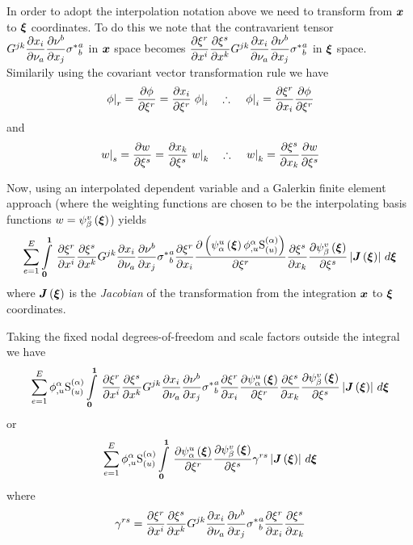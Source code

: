 In order to adopt the interpolation notation above we need to transform from
$\vect{x}$ to $\vect{\xi}$ coordinates. To do this we note that the
contravarient tensor
$G^{jk} \dfrac{\partial x_{i}}{\partial \nu_{a}}  \dfrac{\partial \nu^{b}}{\partial x_{j}} {\sigma^{*}}^{a}_{b}$ in
$\vect{x}$ space becomes
$ \dfrac{\partial \xi^{r}}{\partial x^{i}}  \dfrac{\partial \xi^{s}}{\partial x^{k}} G^{jk} \dfrac{\partial x_{i}}{\partial \nu_{a}}  \dfrac{\partial \nu^{b}}{\partial x_{j}} {\sigma^{*}}^{a}_{b}$
in $\vect{\xi}$ space. Similarily using the covariant vector transformation
rule we have
\begin{equation}
   \left. \phi \right|_{r} = \dfrac{\partial \phi}{\partial \xi^{r}} = \dfrac{\partial x_{i}}{\partial \xi^{r}}  \left. \phi \right|_{i} \quad\therefore\quad \left. \phi \right|_{i} = \dfrac{\partial \xi^{r}}{\partial x_{i}}  \dfrac{\partial \phi}{\partial \xi^{r}} 
\end{equation}
and
\begin{equation}
   \left. w \right|_{s} = \dfrac{\partial w}{\partial \xi^{s}} = \dfrac{\partial x_{k}}{\partial \xi^{s}}  \left. w \right|_{k} \quad\therefore\quad \left. w \right|_{k} = \dfrac{\partial \xi^{s}}{\partial x_{k}}  \dfrac{\partial w}{\partial \xi^{s}} 
\end{equation}

Now, using an interpolated dependent variable and a Galerkin finite element
approach (where the weighting functions are chosen to be the interpolating
basis functions \ie $w=\gbfn{\beta}{v}{\vect{\xi}}$) yields
\begin{equation}
  \dsum_{e=1}^{E}\gint{\vect{0}}{\vect{1}}{\delby{\xi^{r}}{x^{i}}\delby{\xi^{s}}{x^{k}}G^{jk}\delby{x_{i}}{\nu_{a}}\delby{\nu^{b}}{x_{j}}{\sigma^{*}}^{a}_{b}
    \delby{\xi^{r}}{x_{i}}\delby{\pbrac{\gbfn{\alpha}{u}{\vect{\xi}}\nodedof{\phi}{\alpha}{u}\gsf{(\alpha)}{(u)}}}{\xi^{r}}
    \delby{\xi^{s}}{x_{k}}\delby{\gbfn{\beta}{v}{\vect{\xi}}}{\xi^{s}}
    \abs{\fnof{\matr{J}}{\vect{\xi}}}}{\vect{\xi}}
\end{equation}
where $\fnof{\matr{J}}{\vect{\xi}}$ is the \emph{Jacobian} of the
transformation from the integration $\vect{x}$ to $\vect{\xi}$ coordinates.


Taking the fixed nodal degrees-of-freedom and scale factors outside the integral we have
\begin{equation}
  \dsum_{e=1}^{E}\nodedof{\phi}{\alpha}{u}\gsf{(\alpha)}{(u)}
  \gint{\vect{0}}{\vect{1}}{\delby{\xi^{r}}{x^{i}}\delby{\xi^{s}}{x^{k}}G^{jk}\delby{x_{i}}{\nu_{a}}\delby{\nu^{b}}{x_{j}}{\sigma^{*}}^{a}_{b}
    \delby{\xi^{r}}{x_{i}}\delby{\gbfn{\alpha}{u}{\vect{\xi}}}{\xi^{r}}
    \delby{\xi^{s}}{x_{k}}\delby{\gbfn{\beta}{v}{\vect{\xi}}}{\xi^{s}}
    \abs{\fnof{\matr{J}}{\vect{\xi}}}}{\vect{\xi}}
  \label{eqn:elementalfemlhs1}
\end{equation}
or
\begin{equation}
  \dsum_{e=1}^{E}\nodedof{\phi}{\alpha}{u}\gsf{(\alpha)}{(u)}
  \gint{\vect{0}}{\vect{1}}{\delby{\gbfn{\alpha}{u}{\vect{\xi}}}{\xi^{r}}\delby{\gbfn{\beta}{v}{\vect{\xi}}}{\xi^{s}}\gamma^{rs}
    \abs{\fnof{\matr{J}}{\vect{\xi}}}}{\vect{\xi}}
  \label{eqn:elementalfemlhs2}
\end{equation}
where
\begin{equation}
  \gamma^{rs}= \dfrac{\partial \xi^{r}}{\partial x^{i}}  \dfrac{\partial \xi^{s}}{\partial x^{k}} G^{jk} \dfrac{\partial x_{i}}{\partial \nu_{a}}  \dfrac{\partial \nu^{b}}{\partial x_{j}} {\sigma^{*}}^{a}_{b} \dfrac{\partial \xi^{r}}{\partial x_{i}}  \dfrac{\partial \xi^{s}}{\partial x_{k}} 
\end{equation}

